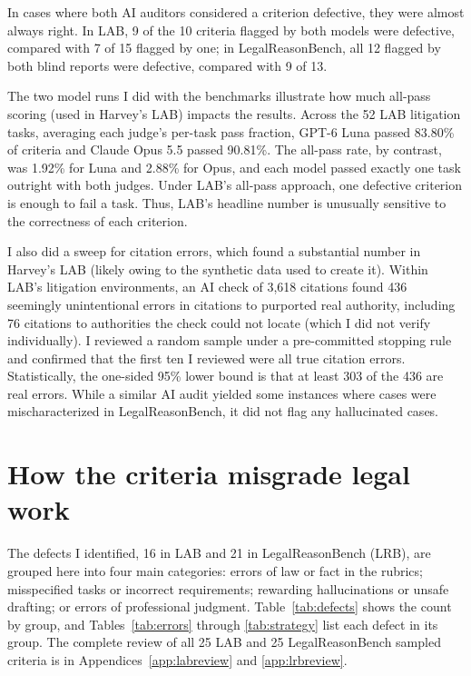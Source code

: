 \documentclass[11pt]{article}
\newcommand{\labTasks}{52}
\newcommand{\labSample}{25}
\newcommand{\labDefective}{16}
\newcommand{\labBothFlagged}{10}
\newcommand{\labBothDefective}{9}
\newcommand{\labSingleFlagged}{15}
\newcommand{\labSingleDefective}{7}
\newcommand{\lrbSample}{25}
\newcommand{\lrbDefective}{21}
\newcommand{\lrbBothFlagged}{12}
\newcommand{\lrbSingleFlagged}{13}
\newcommand{\lrbSingleDefective}{9}
\newcommand{\labCitationsChecked}{3{,}618}
\newcommand{\labCitationErrors}{436}
\newcommand{\labCitationsNotFound}{76}
\newcommand{\labCitationErrorsLB}{303}
\newcommand{\labNativeLunaPassPct}{83.80}
\newcommand{\labNativeOpusPassPct}{90.81}
\newcommand{\labNativeLunaAllPassPct}{1.92}
\newcommand{\labNativeOpusAllPassPct}{2.88}
\begin{document}
In cases where both AI auditors considered a criterion defective, they were almost always right. In LAB, \labBothDefective{} of the \labBothFlagged{} criteria flagged by both models were defective, compared with \labSingleDefective{} of \labSingleFlagged{} flagged by one; in LegalReasonBench, all \lrbBothFlagged{} flagged by both blind reports were defective, compared with \lrbSingleDefective{} of \lrbSingleFlagged{}.

The two model runs I did with the benchmarks illustrate how much all-pass scoring (used in Harvey's LAB) impacts the results. Across the \labTasks{} LAB litigation tasks, averaging each judge's per-task pass fraction, GPT-6 Luna passed \labNativeLunaPassPct\% of criteria and Claude Opus 5.5 passed \labNativeOpusPassPct\%. The all-pass rate, by contrast, was \labNativeLunaAllPassPct\% for Luna and \labNativeOpusAllPassPct\% for Opus, and each model passed exactly one task outright with both judges. Under LAB's all-pass approach, one defective criterion is enough to fail a task. Thus, LAB's headline number is unusually sensitive to the correctness of each criterion.

I also did a sweep for citation errors, which found a substantial number in Harvey's LAB (likely owing to the synthetic data used to create it). Within LAB's litigation environments, an AI check of \labCitationsChecked{} citations found \labCitationErrors{} seemingly unintentional errors in citations to purported real authority, including \labCitationsNotFound{} citations to authorities the check could not locate (which I did not verify individually). I reviewed a random sample under a pre-committed stopping rule and confirmed that the first ten I reviewed were all true citation errors. Statistically, the one-sided 95\% lower bound is that at least \labCitationErrorsLB{} of the \labCitationErrors{} are real errors. While a similar AI audit yielded some instances where cases were mischaracterized in LegalReasonBench, it did not flag any hallucinated cases.

\section{How the criteria misgrade legal work}
\label{sec:mechanisms}

The defects I identified, \labDefective{} in LAB and \lrbDefective{} in LegalReasonBench (LRB), are grouped here into four main categories: errors of law or fact in the rubrics; misspecified tasks or incorrect requirements; rewarding hallucinations or unsafe drafting; or errors of professional judgment. Table~\ref{tab:defects} shows the count by group, and Tables~\ref{tab:errors} through \ref{tab:strategy} list each defect in its group. The complete review of all \labSample{} LAB and \lrbSample{} LegalReasonBench sampled criteria is in Appendices~\ref{app:labreview} and \ref{app:lrbreview}.
\end{document}
